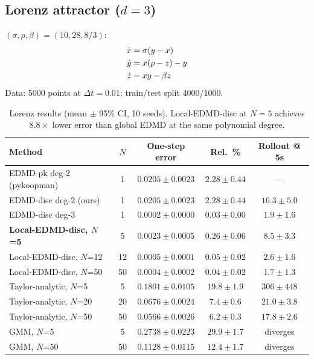 \documentclass[11pt]{article}
\theoremstyle{definition}
\begin{document}
\subsection{Lorenz attractor ($d=3$)}

$(\sigma,\rho,\beta)=(10,28,8/3)$:
\begin{align}
  \dot{x} &= \sigma(y - x) \notag \\
  \dot{y} &= x(\rho - z) - y \notag \\
  \dot{z} &= xy - \beta z \notag
\end{align}
Data: 5000 points at $\Delta t=0.01$; train/test split 4000/1000.

\begin{table}[H]
\centering\small
\begin{tabular}{lcccc}
\toprule
Method & $N$ & One-step error & Rel.\ \% & Rollout @ 5s \\
\midrule
EDMD-pk deg-2 (pykoopman)   & 1  & $0.0205\pm0.0023$ & $2.28\pm0.44$ & --- \\
EDMD-disc deg-2 (ours)      & 1  & $0.0205\pm0.0023$ & $2.28\pm0.44$ & $16.3\pm5.0$ \\
EDMD-disc deg-3             & 1  & $0.0002\pm0.0000$ & $0.03\pm0.00$ & $1.9\pm1.6$ \\
\midrule
\textbf{Local-EDMD-disc, $N$=5}  & 5  & $\mathbf{0.0023\pm0.0005}$ & $\mathbf{0.26\pm0.06}$ & $\mathbf{8.5\pm3.3}$ \\
Local-EDMD-disc, $N$=12 & 12 & $0.0005\pm0.0001$ & $0.05\pm0.02$ & $2.6\pm1.6$ \\
Local-EDMD-disc, $N$=50 & 50 & $0.0004\pm0.0002$ & $0.04\pm0.02$ & $1.7\pm1.3$ \\
\midrule
Taylor-analytic, $N$=5  & 5  & $0.1801\pm0.0105$ & $19.8\pm1.9$ & $306\pm448$ \\
Taylor-analytic, $N$=20 & 20 & $0.0676\pm0.0024$ & $7.4\pm0.6$ & $21.0\pm3.8$ \\
Taylor-analytic, $N$=50 & 50 & $0.0566\pm0.0026$ & $6.2\pm0.3$ & $17.8\pm2.6$ \\
\midrule
GMM, $N$=5  & 5  & $0.2738\pm0.0223$ & $29.9\pm1.7$ & diverges \\
GMM, $N$=50 & 50 & $0.1128\pm0.0115$ & $12.4\pm1.7$ & diverges \\
\bottomrule
\end{tabular}
\caption{Lorenz results (mean $\pm$ 95\% CI, 10 seeds). Local-EDMD-disc at $N=5$ achieves $8.8\times$ lower error than global EDMD at the same polynomial degree.}
\label{tab:lorenz}
\end{table}
\end{document}
